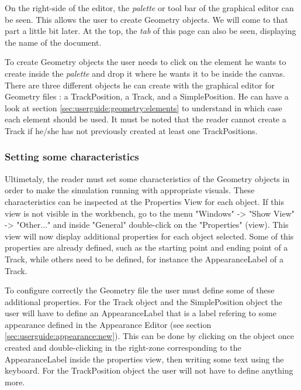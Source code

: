 On the right-side of the editor, the \textit{palette} or tool bar of the graphical editor can be seen. This allows the user to create Geometry objects. We will come to that part a little bit later. At the top, the \textit{tab} of this page can also be seen, displaying the name of the document. 

To create Geometry objects the user needs to click on the element he wants to create inside the \textit{palette} and drop it where he wants it to be inside the canvas. There are three different objects he can create with the graphical editor for Geometry files : a TrackPosition, a Track, and a SimplePosition. He can have a look at section \ref{sec:userguide:geometry:elements} to understand in which case each element should be used. It must be noted that the reader cannot create a Track if he/she has not previously created at least one TrackPositions. 


\subsubsection{Setting some characteristics}
\label{sec:userguide:geometry:characteristics}
Ultimetaly, the reader must set some characteristics of the Geometry objects in order to make the simulation running with appropriate visuals. These characteristics can be inspected at the Properties View  for each object. If this view is not visible in the workbench, go to the menu "Windows" -> "Show View" -> "Other..." and inside "General" double-click on the "Properties" (view). This view will now display additional properties for each object selected. Some of this properties are already defined, such as the starting point and ending point of a Track, while others need to be defined, for instance the AppearanceLabel of a Track.

\label{sec:userguide:geometry:appearance}
To configure correctly the Geometry file the user must define some of these additional properties. For the Track object and the SimplePosition object the user will have to define an AppearanceLabel that is a label refering to some appearance defined in the Appearance Editor (see section \ref{sec:userguide:appearance:new}). This can be done by clicking on the object once created and double-clicking in the right-zone corresponding to the AppearanceLabel inside the properties view, then writing some text using the keyboard. For the TrackPosition object the user will not have to define anything more.

